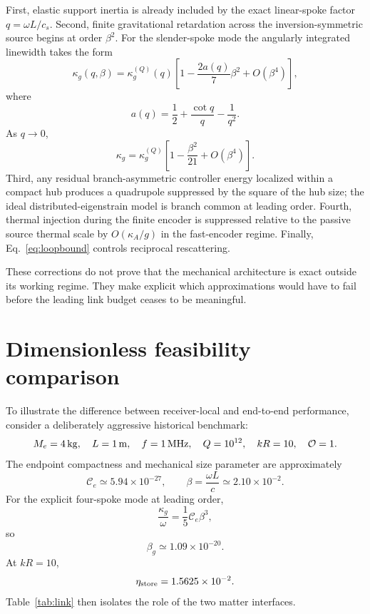 \documentclass[11pt]{article}
\begin{document}
First, elastic support inertia is already included by the exact linear-spoke factor $q=\omega L/c_s$. Second, finite gravitational retardation across the inversion-symmetric source begins at order $\beta^2$. For the slender-spoke mode the angularly integrated linewidth takes the form
\begin{equation}
\kappa_g(q,\beta)
=\kappa_g^{(Q)}(q)
\left[
1-\frac{2a(q)}7\beta^2+O(\beta^4)
\right],
\end{equation}
where
\begin{equation}
a(q)=\frac12+\frac{\cot q}{q}-\frac1{q^2}.
\end{equation}
As $q\to0$,
\begin{equation}
\boxed{
\kappa_g
=\kappa_g^{(Q)}
\left[1-\frac{\beta^2}{21}+O(\beta^4)\right].
}
\end{equation}
Third, any residual branch-asymmetric controller energy localized within a compact hub produces a quadrupole suppressed by the square of the hub size; the ideal distributed-eigenstrain model is branch common at leading order. Fourth, thermal injection during the finite encoder is suppressed relative to the passive source thermal scale by $O(\kappa_A/g)$ in the fast-encoder regime. Finally, Eq.~\eqref{eq:loopbound} controls reciprocal rescattering.

These corrections do not prove that the mechanical architecture is exact outside its working regime. They make explicit which approximations would have to fail before the leading link budget ceases to be meaningful.

\section{Dimensionless feasibility comparison}
\label{sec:benchmark}

To illustrate the difference between receiver-local and end-to-end performance, consider a deliberately aggressive historical benchmark:
\begin{equation}
M_e=4\,{\rm kg},
\quad
L=1\,{\rm m},
\quad
f=1\,{\rm MHz},
\quad
Q=10^{12},
\quad
kR=10,
\quad
\mathcal O=1.
\end{equation}
The endpoint compactness and mechanical size parameter are approximately
\begin{equation}
\mathcal C_e\simeq5.94\times10^{-27},
\qquad
\beta=\frac{\omega L}{c}\simeq2.10\times10^{-2}.
\end{equation}
For the explicit four-spoke mode at leading order,
\begin{equation}
\frac{\kappa_g}{\omega}
=\frac15\mathcal C_e\beta^3,
\end{equation}
so
\begin{equation}
\boxed{
\beta_g\simeq1.09\times10^{-20}.
}
\end{equation}
At $kR=10$,
\begin{equation}
\eta_{\rm store}=1.5625\times10^{-2}.
\end{equation}
Table~\ref{tab:link} then isolates the role of the two matter interfaces.
\end{document}
